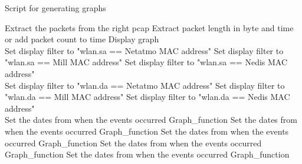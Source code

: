 \begin{algorithm}[H]
\caption{Script for generating graphs}\label{alg:GraphScript}
    \begin{algorithmic}[1]
         
            \State Extract the packets from the right pcap
                \State Extract packet length in byte and time or add packet count to time
                \State Display graph
            \EndFor
        \EndFor {}\\
         
                \State Set display filter to "wlan.sa == Netatmo \gls{MAC} address"
                \State Set display filter to "wlan.sa == Mill \gls{MAC} address"
                \State Set display filter to "wlan.sa == Nedis \gls{MAC} address"    
            \EndIf \\
         
                \State Set display filter to "wlan.da == Netatmo \gls{MAC} address"
                \State Set display filter to "wlan.da == Mill \gls{MAC} address"
                \State Set display filter to "wlan.da == Nedis \gls{MAC} address"  
            \EndIf
        \EndIf \\
         
            \State Set the dates from when the events occurred 
            \State Graph\_function
            \State Set the dates from when the events occurred 
            \State Graph\_function
            \State Set the dates from when the events occurred 
            \State Graph\_function
            \State Set the dates from when the events occurred 
            \State Graph\_function
            \State Set the dates from when the events occurred 
            \State Graph\_function
        \EndIf {}
    \end{algorithmic}
\end{algorithm}

